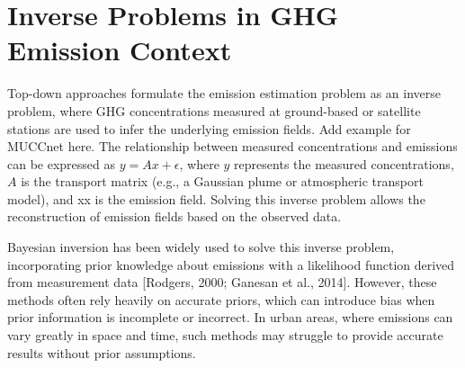 


\section{Inverse Problems in GHG Emission Context}
Top-down approaches formulate the emission estimation problem as an inverse problem, where GHG concentrations measured at ground-based or satellite stations are used to infer the underlying emission fields.
Add example for MUCCnet here.
The relationship between measured concentrations and emissions can be expressed as $y= A x + \epsilon$, where $y$ represents the measured concentrations, $A$ is the transport matrix (e.g., a Gaussian plume or atmospheric transport model), and xx is the emission field.
Solving this inverse problem allows the reconstruction of emission fields based on the observed data.

Bayesian inversion has been widely used to solve this inverse problem, incorporating prior knowledge about emissions with a likelihood function derived from measurement data [Rodgers, 2000; Ganesan et al., 2014].
However, these methods often rely heavily on accurate priors, which can introduce bias when prior information is incomplete or incorrect.
In urban areas, where emissions can vary greatly in space and time, such methods may struggle to provide accurate results without prior assumptions.

